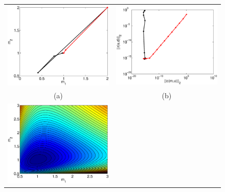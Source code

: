\documentclass{iopart}
\begin{document}
\begin{figure}
\centering
\begin{tabular}{cc}
\includegraphics[scale=.4]{./figs/opt_b}&
\includegraphics[scale=.4]{./figs/opt_c}\\
{\small (a)}&{\small (b)}\\
\includegraphics[scale=.4]{./figs/opt_d}&

\end{tabular}
\end{figure}
\end{document}
